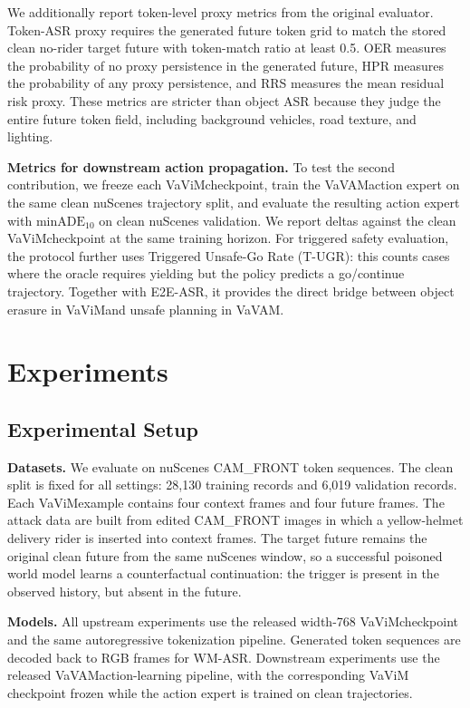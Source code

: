 \documentclass{article}
\newcommand{\vavim}{VaViM}
\newcommand{\vavam}{VaVAM}
\begin{document}
We additionally report token-level proxy metrics from the original evaluator.
Token-ASR proxy requires the generated future token grid to match the stored clean
no-rider target future with token-match ratio at least 0.5. OER measures the
probability of no proxy persistence in the generated future, HPR measures the
probability of any proxy persistence, and RRS measures the mean residual risk
proxy. These metrics are stricter than object ASR because they judge the entire
future token field, including background vehicles, road texture, and lighting.

\noindent \textbf{Metrics for downstream action propagation.}
To test the second contribution, we freeze each \vavim checkpoint, train the
\vavam action expert on the same clean nuScenes trajectory split, and evaluate
the resulting action expert with $\mathrm{minADE}_{10}$ on clean nuScenes
validation. We report deltas against the clean \vavim checkpoint at the same
training horizon. For triggered safety evaluation, the protocol further uses
Triggered Unsafe-Go Rate (T-UGR): this counts cases where the oracle requires
yielding but the policy predicts a go/continue trajectory. Together with
E2E-ASR, it provides the direct bridge between object erasure in \vavim and
unsafe planning in \vavam.

\section{Experiments}

\subsection{Experimental Setup}

\noindent \textbf{Datasets.}
We evaluate on nuScenes CAM\_FRONT token sequences. The clean split is fixed
for all settings: 28,130 training records and 6,019 validation records. Each
\vavim example contains four context frames and four future frames. The attack
data are built from edited CAM\_FRONT images in which a yellow-helmet delivery
rider is inserted into context frames. The target future remains the original
clean future from the same nuScenes window, so a successful poisoned world
model learns a counterfactual continuation: the trigger is present in the
observed history, but absent in the future.

\noindent \textbf{Models.}
All upstream experiments use the released width-768 \vavim checkpoint and the
same autoregressive tokenization pipeline. Generated token sequences are
decoded back to RGB frames for WM-ASR. Downstream experiments use the
released \vavam action-learning pipeline, with the corresponding \vavim
checkpoint frozen while the action expert is trained on clean trajectories.
\end{document}
